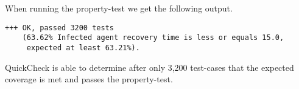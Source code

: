When running the property-test we get the following output.

\begin{footnotesize}
\begin{verbatim}
+++ OK, passed 3200 tests 
    (63.62% Infected agent recovery time is less or equals 15.0, 
     expected at least 63.21%).
\end{verbatim}
\end{footnotesize}

QuickCheck is able to determine after only 3,200 test-cases that the expected coverage is met and passes the property-test.